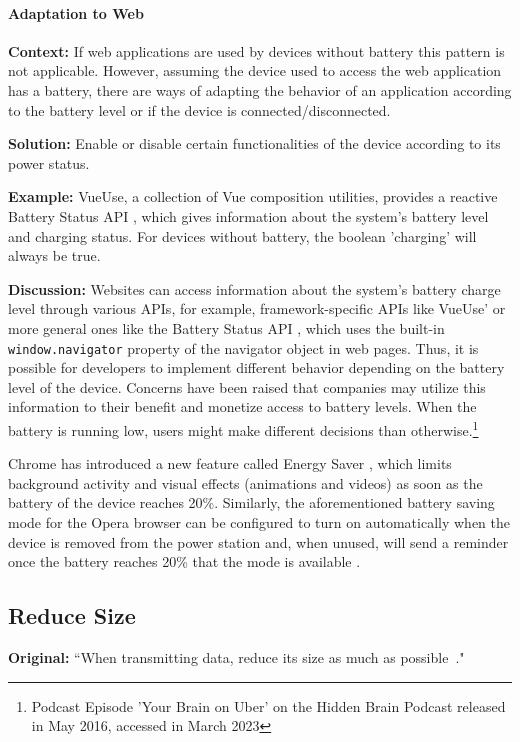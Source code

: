 \paragraph{Adaptation to Web}\mbox{}

\textbf{Context:} If web applications are used by devices without battery this pattern is not applicable. However, assuming the device used to access the web application has a battery, there are ways of adapting the behavior of an application according to the battery level or if the device is connected/disconnected.

\textbf{Solution:} Enable or disable certain functionalities of the device according to its power status.

\textbf{Example:} VueUse, a collection of Vue composition utilities, provides a reactive Battery Status API \cite{vueuse-useBattery}, which gives information about the system's battery level and charging status. For devices without battery, the boolean 'charging' will always be true.

\textbf{Discussion:} Websites can access information about the system's battery charge level through various APIs, for example, framework-specific APIs like VueUse'  or more general ones like the Battery Status API \cite{dev-mozilla-battery-status-api}, which uses the built-in \texttt{window.navigator} property of the navigator object in web pages. Thus, it is possible for developers to implement different behavior depending on the battery level of the device. Concerns have been raised that companies may utilize this information to their benefit and monetize access to battery levels. When the battery is running low, users might make different decisions than otherwise.\footnote{Podcast Episode 'Your Brain on Uber' on the Hidden Brain Podcast released in May 2016, accessed in March 2023}

Chrome has introduced a new feature called Energy Saver \cite{chrome-new-feature}, which limits background activity and visual effects (\eg animations and videos) as soon as the battery of the device reaches 20\%. Similarly, the aforementioned battery saving mode for the Opera browser can be configured to turn on automatically when the device is removed from the power station and, when unused, will send a reminder once the battery reaches 20\% that the mode is available \cite{opera-battery-saver}.

\subsection{Reduce Size} \label{sec:patterns-ReduceSize}
\textbf{Original:} ``When transmitting data, reduce its size as much as possible~\cite{cruz2019catalog}."

